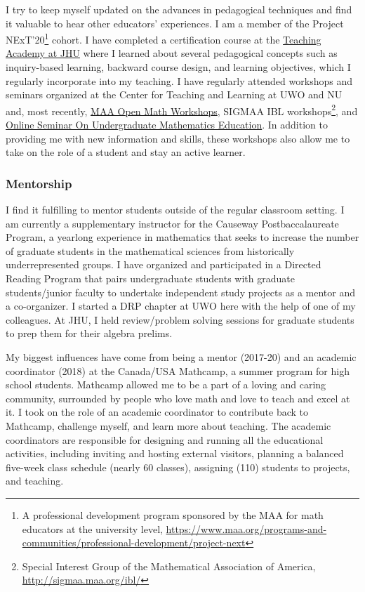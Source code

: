\documentclass[
]{report}
\begin{document}
I try to keep myself updated on the advances in pedagogical techniques and find it valuable to hear other educators' experiences. I am a member of the Project NExT'20\footnote{A professional development program sponsored by the MAA for math educators at the university level, \url{https://www.maa.org/programs-and-communities/professional-development/project-next}} cohort. I have completed a certification course at the \href{https://ctei.jhu.edu/teaching-academy}{Teaching Academy at JHU} where I learned about several pedagogical concepts such as inquiry-based learning, backward course design, and learning objectives, which I regularly incorporate into my teaching. I have regularly attended workshops and seminars organized at the Center for Teaching and Learning at UWO and NU and, most recently, \href{https://www.maa.org/programs-and-communities/professional-development/open-math}{MAA Open Math Workshops}, SIGMAA IBL workshops\footnote{Special Interest Group of the Mathematical Association of America, \url{http://sigmaa.maa.org/ibl/}}, and \href{https://olsume.org/}{Online Seminar On Undergraduate Mathematics Education}.
In addition to providing me with new information and skills, these workshops also allow me to take on the role of a student and stay an active learner.

\hypertarget{mentorship}{%
\subsubsection*{Mentorship}\label{mentorship}}


I find it fulfilling to mentor students outside of the regular classroom setting.
I am currently a supplementary instructor for the Causeway Postbaccalaureate Program, a yearlong experience in mathematics that seeks to increase the number of graduate students in the mathematical sciences from historically underrepresented groups. I have organized and participated in a Directed Reading Program that pairs undergraduate students with graduate students/junior faculty to undertake independent study projects as a mentor and a co-organizer. I started a DRP chapter at UWO here with the help of one of my colleagues. At JHU, I held review/problem solving sessions for graduate students to prep them for their algebra prelims.

My biggest influences have come from being a mentor (2017-20) and an academic coordinator (2018) at the Canada/USA Mathcamp, a summer program for high school students. Mathcamp allowed me to be a part of a loving and caring community, surrounded by people who love math and love to teach and excel at it. I took on the role of an academic coordinator to contribute back to Mathcamp, challenge myself, and learn more about teaching. The academic coordinators are responsible for designing and running all the educational activities, including inviting and hosting external visitors, planning a balanced five-week class schedule (nearly 60 classes), assigning (110) students to projects, and teaching.
\end{document}
